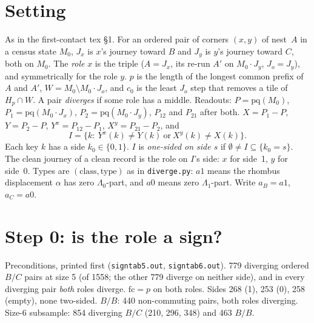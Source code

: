 \documentclass[11pt]{article}
\theoremstyle{definition}\newtheorem{definition}[theorem]{Definition}\newtheorem{remark}[theorem]{Remark}
\begin{document}
\section{Setting}\label{sec:set}
As in the first-contact tex \S1. For an ordered pair of corners $(x,y)$ of nest~$A$ in a census state $M_0$, $J_x$ is $x$'s journey toward $B$ and $J_y$ is $y$'s journey toward $C$, both on $M_0$. The \emph{role} $x$ is the triple ($A=J_x$, its re-run $A'$ on $M_0\cdot J_y$, $J_o=J_y$), and symmetrically for the role $y$. $p$ is the length of the longest common prefix of $A$ and $A'$, $W=M_0\setminus M_0\cdot J_o$, and $c_0$ is the least $J_o$ step that removes a tile of $H_p\cap W$. A pair \emph{diverges} if some role has a middle. Readouts: $P=\mathrm{pq}(M_0)$, $P_1=\mathrm{pq}(M_0\cdot J_x)$, $P_2=\mathrm{pq}(M_0\cdot J_y)$, $P_{12}$ and $P_{21}$ after both. $X=P_1-P$, $Y=P_2-P$, $Y^x=P_{12}-P_1$, $X^y=P_{21}-P_2$, and
\[I=\{k:\ Y^x(k)\ne Y(k)\ \text{or}\ X^y(k)\ne X(k)\}.\]
Each key $k$ has a side $k_0\in\{0,1\}$. $I$ is \emph{one-sided on side $s$} if $\emptyset\ne I\subseteq\{k_0=s\}$. The clean journey of a clean record is the role on $I$'s side: $x$ for side~1, $y$ for side~0. Types are $(\text{class},\text{type})$ as in \texttt{diverge.py}: $a1$ means the rhombus displacement $\alpha$ has zero $\Lambda_0$-part, and $a0$ means zero $\Lambda_1$-part. Write $a_B=a1$, $a_C=a0$.

\section{Step 0: is the role a sign?}\label{sec:step0}
Preconditions, printed first (\texttt{signtab5.out}, \texttt{signtab6.out}). 779 diverging ordered $B/C$ pairs at size 5 (of 1558; the other 779 diverge on neither side), and in every diverging pair \emph{both} roles diverge. $\mathrm{fc}=p$ on both roles. Sides 268 (1), 253 (0), 258 (empty), none two-sided. $B/B$: 440 non-commuting pairs, both roles diverging. Size-6 subsample: 854 diverging $B/C$ (210, 296, 348) and 463 $B/B$.
\end{document}
